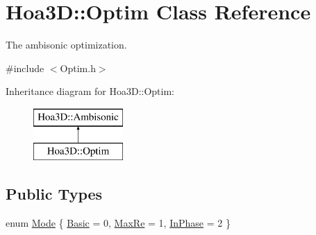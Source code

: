\hypertarget{class_hoa3_d_1_1_optim}{\section{Hoa3\-D\-:\-:Optim Class Reference}
\label{class_hoa3_d_1_1_optim}
}


The ambisonic optimization.  




{\ttfamily \#include $<$Optim.\-h$>$}

Inheritance diagram for Hoa3\-D\-:\-:Optim\-:\begin{figure}[H]
\begin{center}
\leavevmode
\includegraphics[height=2.000000cm]{class_hoa3_d_1_1_optim}
\end{center}
\end{figure}
\subsection*{Public Types}
\begin{DoxyCompactItemize}
\item 
enum \hyperlink{class_hoa3_d_1_1_optim_a1a153ac21e7a112279824f17981cf147}{Mode} \{ \hyperlink{class_hoa3_d_1_1_optim_a1a153ac21e7a112279824f17981cf147a89acb58975922396713cc88cafc55b45}{Basic} = 0, 
\hyperlink{class_hoa3_d_1_1_optim_a1a153ac21e7a112279824f17981cf147a491a405ba48de3977668d54a8d9ff44a}{Max\-Re} = 1, 
\hyperlink{class_hoa3_d_1_1_optim_a1a153ac21e7a112279824f17981cf147a55da4ad4519ee8860e9ea45cc475241c}{In\-Phase} = 2
 \}
\end{DoxyCompactItemize}
